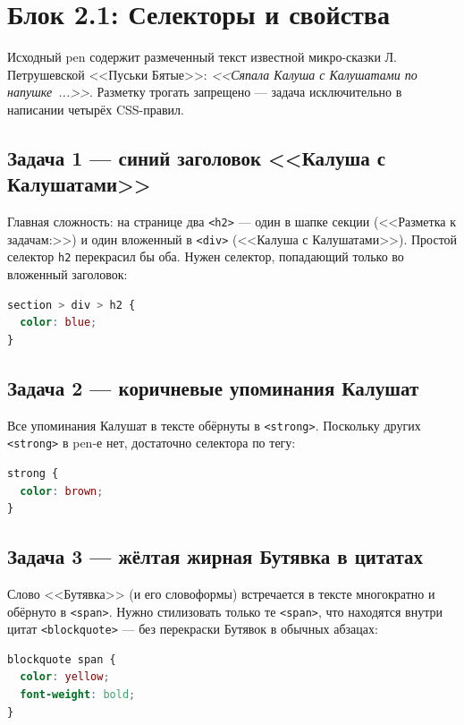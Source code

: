 \section{Блок 2.1: Селекторы и свойства}

Исходный pen содержит размеченный текст известной микро-сказки
Л.\,Петрушевской <<Пуськи Бятые>>: \textit{<<Сяпала Калуша с
Калушатами по напушке~...>>}. Разметку трогать запрещено --- задача
исключительно в написании четырёх CSS-правил.

\subsection{Задача 1 --- синий заголовок <<Калуша с Калушатами>>}

Главная сложность: на странице два \texttt{<h2>} --- один в шапке
секции (<<Разметка к задачам:>>) и один вложенный в
\texttt{<div>} (<<Калуша с Калушатами>>). Простой селектор
\texttt{h2} перекрасил бы оба. Нужен селектор, попадающий только во
вложенный заголовок:

\begin{lstlisting}[language=CSS]
section > div > h2 {
  color: blue;
}
\end{lstlisting}

\subsection{Задача 2 --- коричневые упоминания Калушат}

Все упоминания Калушат в тексте обёрнуты в \texttt{<strong>}.
Поскольку других \texttt{<strong>} в pen-е нет, достаточно
селектора по тегу:

\begin{lstlisting}[language=CSS]
strong {
  color: brown;
}
\end{lstlisting}

\subsection{Задача 3 --- жёлтая жирная Бутявка в цитатах}

Слово <<Бутявка>> (и его словоформы) встречается в тексте многократно
и обёрнуто в \texttt{<span>}. Нужно стилизовать только те
\texttt{<span>}, что находятся внутри цитат \texttt{<blockquote>} ---
без перекраски Бутявок в обычных абзацах:

\begin{lstlisting}[language=CSS]
blockquote span {
  color: yellow;
  font-weight: bold;
}
\end{lstlisting}

